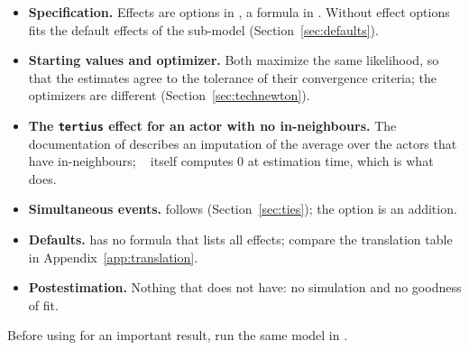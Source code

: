 \begin{itemize}[nosep]
  \item \textbf{Specification.} Effects are options in \nwdynam{}, a formula in \goldfish{}. Without effect options \nwdynam{} fits the default effects of the sub-model (Section~\ref{sec:defaults}).
  \item \textbf{Starting values and optimizer.} Both maximize the same likelihood, so that the estimates agree to the tolerance of their convergence criteria; the optimizers are different (Section~\ref{sec:technewton}).
  \item \textbf{The \texttt{tertius} effect for an actor with no in-neighbours.} The documentation of \goldfish{} describes an imputation of the average over the actors that have in-neighbours; \goldfish{}~\gfver{} itself computes 0 at estimation time, which is what \nwdynam{} does.
  \item \textbf{Simultaneous events.} \nwdynam{} follows \goldfish{} (Section~\ref{sec:ties}); the option  is an addition.
  \item \textbf{Defaults.} \nwdynam{} has no formula that lists all effects; compare the translation table in Appendix~\ref{app:translation}.
  \item \textbf{Postestimation.} Nothing that \goldfish{} does not have: no simulation and no goodness of fit.
\end{itemize}
Before using \nwdynam{} for an important result, run the same model in \goldfish{}.
